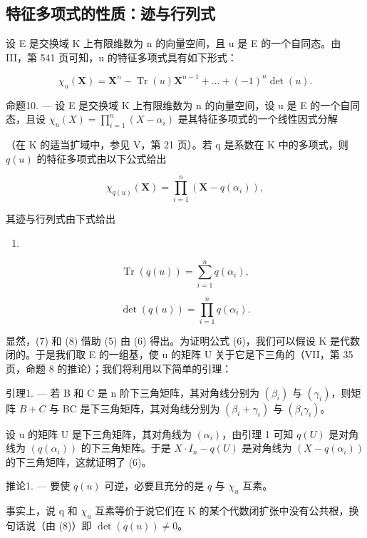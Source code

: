 \subsection{特征多项式的性质：迹与行列式}

设 E 是交换域 K 上有限维数为 n 的向量空间，且 u 是 E 的一个自同态。由 III，第 541 页可知，u 的特征多项式具有如下形式：

\[
\chi_ {u} (\mathbf {X}) = \mathbf {X} ^ {n} - \operatorname{Tr} (u) \mathbf {X} ^ {n - 1} + \dots + (- 1) ^ {n} \det (u).\tag{5}
\]

命题10. --- 设 E 是交换域 K 上有限维数为 n 的向量空间，设 u 是 E 的一个自同态，且设 \(\chi_u(X) = \prod_{i=1}^{n}(X - \alpha_i)\) 是其特征多项式的一个线性因式分解

（在 K 的适当扩域中，参见 V，第 21 页）。若 q 是系数在 K 中的多项式，则 \(q(u)\) 的特征多项式由以下公式给出

\[
\chi_ {q (u)} (\mathbf {X}) = \prod_ {i = 1} ^ {n} \left(\mathbf {X} - q \left(\alpha_ {i}\right)\right),\tag{6}
\]

其迹与行列式由下式给出

\begin{enumerate}
\def\labelenumi{(\arabic{enumi})}
\setcounter{enumi}{6}
\tightlist
\item
\end{enumerate}

\[
\operatorname{Tr} (q (u)) = \sum_ {i = 1} ^ {n} q (\alpha_ {i}),\tag{8}
\]

\[
\det (q (u)) = \prod_ {i = 1} ^ {n} q (\alpha_ {i}).
\]

显然，(7) 和 (8) 借助 (5) 由 (6) 得出。为证明公式 (6)，我们可以假设 K 是代数闭的。于是我们取 E 的一组基，使 u 的矩阵 U 关于它是下三角的（VII，第 35 页，命题 8 的推论）；我们将利用以下简单的引理：

引理1. --- 若 B 和 C 是 n 阶下三角矩阵，其对角线分别为 \((\beta_{i})\) 与 \((\gamma_{i})\)，则矩阵 \(B + C\) 与 BC 是下三角矩阵，其对角线分别为 \((\beta_{i} + \gamma_{i})\) 与 \((\beta_{i}\gamma_{i})\)。

设 u 的矩阵 U 是下三角矩阵，其对角线为 \((\alpha_{i})\)，由引理 1 可知 \(q(U)\) 是对角线为 \((q(\alpha_{i}))\) 的下三角矩阵。于是 \(X \cdot I_{n} - q(U)\) 是对角线为 \((X - q(\alpha_{i}))\) 的下三角矩阵，这就证明了 (6)。

推论1. --- 要使 \(q(u)\) 可逆，必要且充分的是 \(q\) 与 \(\chi_u\) 互素。

事实上，说 q 和 \(\chi_{u}\) 互素等价于说它们在 K 的某个代数闭扩张中没有公共根，换句话说（由 (8)）即 \(\det(q(u)) \neq 0\)。

